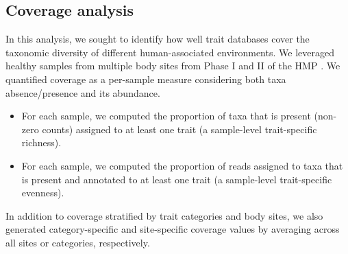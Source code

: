 \documentclass[10pt,letterpaper]{article}
\begin{document}
\subsection*{Coverage analysis}  

In this analysis, we sought to identify how well trait databases cover the taxonomic diversity of different human-associated environments. We leveraged healthy samples from multiple body sites from Phase I and II of the HMP \cite{consortium2012structure}. We quantified coverage as a per-sample measure considering both taxa absence/presence and its abundance.   
\begin{itemize}
    \item For each sample, we computed the proportion of taxa that is present (non-zero counts) assigned to at least one trait (a sample-level trait-specific richness). 
    \item For each sample, we computed the proportion of reads assigned to taxa that is present and annotated to at least one trait (a sample-level trait-specific evenness).
\end{itemize}

In addition to coverage stratified by trait categories and body sites, we also generated category-specific and site-specific coverage values by averaging across all sites or categories, respectively.  


\end{document}
